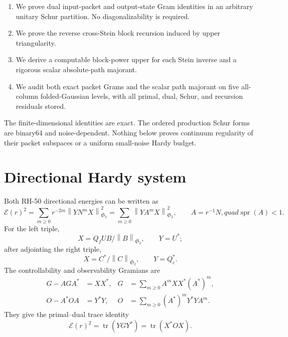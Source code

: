 \documentclass[11pt]{article}
\theoremstyle{remark}
\newcommand{\norm}[1]{\left\lVert#1\right\rVert}
\newcommand{\HS}{\mathfrak S_2}
\newcommand{\cE}{\mathcal E}
\newcommand{\tr}{\operatorname{tr}}
\newcommand{\spr}{\operatorname{spr}}
\begin{document}
\begin{enumerate}[leftmargin=2.2em]
 \item We prove dual input-packet and output-state Gram identities in an
       arbitrary unitary Schur partition.  No diagonalizability is required.
 \item We prove the reverse cross-Stein block recursion induced by upper
       triangularity.
 \item We derive a computable block-power upper for each Stein inverse and a
       rigorous scalar absolute-path majorant.
 \item We audit both exact packet Grams and the scalar path majorant on five
       all-column folded-Gaussian levels, with all primal, dual, Schur, and
       recursion residuals stored.
\end{enumerate}

The finite-dimensional identities are exact.  The ordered production Schur
forms are binary64 and noise-dependent.  Nothing below proves continuum
regularity of their packet subspaces or a uniform small-noise Hardy budget.

\section{Directional Hardy system}
\label{sec:system}

Both RH-50 directional energies can be written as
\begin{equation}
 \cE(r)^2
 =\sum_{m\ge0}r^{-2m}\norm{YN^mX}_{\HS}^2
 =\sum_{m\ge0}\norm{YA^mX}_{\HS}^2,
 \qquad A=r^{-1}N,quad \spr(A)<1.
 \label{eq:hardy}
\end{equation}
For the left triple,
\[
 X=Q_fUB/\norm B_{\HS},\qquad Y=U^*;
\]
after adjointing the right triple,
\[
 X=C^*/\norm C_{\HS},\qquad Y=Q_c^*.
\]
The controllability and observability Gramians are
\begin{align}
 G-AGA^*&=XX^*,
 &G&=\sum_{m\ge0}A^mXX^*(A^*)^m,
 \label{eq:controllability}\\
 O-A^*OA&=Y^*Y,
 &O&=\sum_{m\ge0}(A^*)^mY^*YA^m.
 \label{eq:observability}
\end{align}
They give the primal--dual trace identity
\begin{equation}
 \cE(r)^2=\tr(YGY^*)=\tr(X^*OX).
 \label{eq:primal-dual}
\end{equation}
\end{document}
